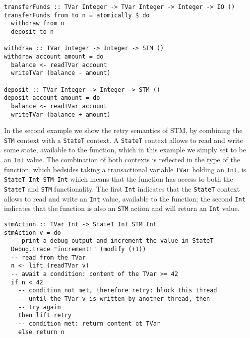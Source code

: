 \begin{footnotesize}
\begin{verbatim}
transferFunds :: TVar Integer -> TVar Integer -> Integer -> IO ()
transferFunds from to n = atomically $ do
  withdraw from n
  deposit to n
  
withdraw :: TVar Integer -> Integer -> STM ()
withdraw account amount = do
  balance <- readTVar account
  writeTVar (balance - amount)
  
deposit :: TVar Integer -> Integer -> STM ()
deposit account amount = do
  balance <- readTVar account
  writeTVar (balance + amount)
\end{verbatim}
\end{footnotesize}

\medskip %

In the second example we show the retry semantics of STM, by combining the \texttt{STM} context with a \texttt{StateT} context. A \texttt{StateT} context allows to read and write some state, available to the function, which in this example we simply set to be an \texttt{Int} value. The combination of both contexts is reflected in the type of the function, which bedsides taking a transactional variable \texttt{TVar} holding an \texttt{Int}, is \texttt{StateT Int STM Int} which means that the function has access to both the \texttt{StateT} and \texttt{STM} functionality. The first \texttt{Int} indicates that the \texttt{StateT} context allows to read and write an \texttt{Int} value, available to the function; the second \texttt{Int} indicates that the function is also an \texttt{STM} action and will return an \texttt{Int} value. \\ %

\begin{footnotesize}
\begin{verbatim}
stmAction :: TVar Int -> StateT Int STM Int 
stmAction v = do
  -- print a debug output and increment the value in StateT 
  Debug.trace "increment!" (modify (+1))
  -- read from the TVar
  n <- lift (readTVar v)
  -- await a condition: content of the TVar >= 42
  if n < 42
    -- condition not met, therefore retry: block this thread
    -- until the TVar v is written by another thread, then
    -- try again
    then lift retry
    -- condition met: return content ot TVar
    else return n
\end{verbatim}
\end{footnotesize}

